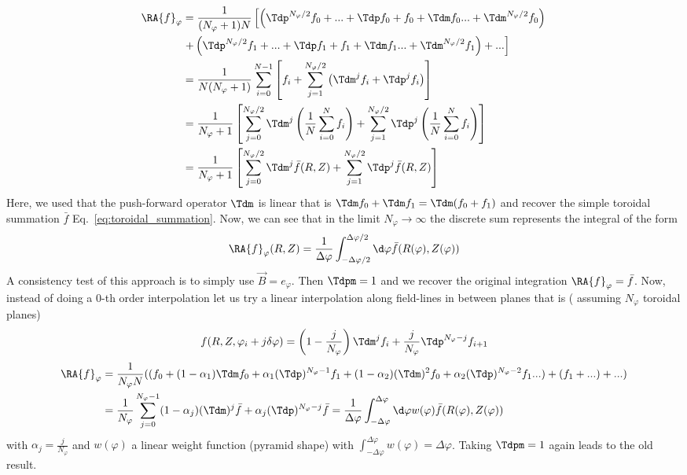 \begin{align}
    \RA{f}_\varphi &= \frac{1}{(N_\varphi+1) N} \left[\left(
    {\Tdp}^{N_\varphi/2} f_0 + ... + \Tdp f_0 + f_0 + \Tdm f_0 ... + {\Tdm}^{N_\varphi/2} f_0\right)\right. \nonumber\\
    &\left. +\left( {\Tdp}^{N_\varphi/2} f_1 + ... + \Tdp f_1 + f_1 + \Tdm f_1 ... + {\Tdm}^{N_\varphi/2} f_1\right)  + ... \right] \nonumber\\
    &= \frac{1}{N (N_\varphi+1)} \sum_{i=0}^{N-1} \left[f_i + \sum_{j=1}^{N_\varphi/2} \left( {\Tdm}^j f_i + {\Tdp}^jf_i\right)\right] \nonumber\\
    &=
    \frac{1}{N_\varphi+1} \left[ \sum_{j=0}^{N_\varphi/2}  {\Tdm}^j \left(\frac{1}{N}\sum_{i=0}^{N} f_i\right)
    +
    \sum_{j=1}^{N_\varphi/2}  {\Tdp}^j \left(\frac{1}{N}\sum_{i=0}^{N} f_i\right)\right]
    \nonumber\\
    &=
    \frac{1}{N_\varphi+1} \left[ \sum_{j=0}^{N_\varphi/2}  {\Tdm}^j \bar f(R,Z)
    +
    \sum_{j=1}^{N_\varphi/2}  {\Tdp}^j \bar f(R,Z)\right]
\end{align}
Here, we used that the push-forward operator $\Tdm$ is linear that is $\Tdm f_0 + \Tdm f_1 = \Tdm (f_0+f_1)$
and recover the simple toroidal summation $\bar f$ Eq.~\eqref{eq:toroidal_summation}.
Now, we can see that in the limit $N_\varphi \rightarrow\infty$ the discrete sum represents the integral
of the form
\begin{align}
    \RA{f}_\varphi(R,Z) = \frac{1}{\Delta\varphi}\int_{-\Delta\varphi/2}^{\Delta\varphi/2}\d\varphi \bar f(R(\varphi),Z(\varphi))
\end{align}
A consistency test of this approach is to simply use $\vec B = e_\varphi$. Then
$\Tdpm = 1$ and we recover the original integration $\RA{f}_\varphi= \bar f$.
Now, instead of doing a 0-th order interpolation let us try a linear interpolation along field-lines in between planes that is ( assuming $N_\varphi$ toroidal planes)
\begin{align}
    f(R,Z,\varphi_i + j\delta\varphi) = \left(1-\frac{j}{N_\varphi}\right){\Tdm}^j f_i + \frac{j}{N_\varphi} {\Tdp}^{N_\varphi -j}f_{i+1}
\end{align}
\begin{align}
    \RA{ f}_\varphi &= \frac{1}{N_\varphi N} (( f_0 + (1-\alpha_1)\Tdm f_0 + \alpha_1 (\Tdp)^{N_\varphi -1} f_1 + (1-\alpha_2)(\Tdm)^2 f_0 + \alpha_2 (\Tdp)^{N_\varphi-2} f_1 ...  )+ (f_1 + ...) + ...)\nonumber\\
    &= \frac{1}{ N_\varphi} \sum_{j=0}^{N_\varphi-1}  (1-\alpha_j)(\Tdm)^j \bar f+\alpha_j (\Tdp)^{N_\varphi -j} \bar f
    = \frac{1}{\Delta\varphi}\int_{-\Delta\varphi}^{\Delta\varphi}\d\varphi w(\varphi) \bar f (R(\varphi),Z(\varphi))
    \label{eq:cta}
\end{align}
with $\alpha_j = \frac{j}{N_\varphi}$ and $w(\varphi)$ a linear weight function (pyramid shape) with $\int_{-\Delta\varphi}^{\Delta\varphi} w(\varphi) = \Delta\varphi$. Taking $\Tdpm=1$ again leads to the old result.


